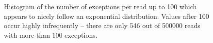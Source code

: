\begin{figure}
	\centering

	\caption[Histogram of the number of exceptions per read.]{\label{fig:nex-hist}Histogram of the number of exceptions per read up to 100 which appears to nicely follow an exponential distribution. Values after 100 occur highly infrequently -- there are only 546 out of \num{500000} reads with more than 100 exceptions.}
\end{figure}
